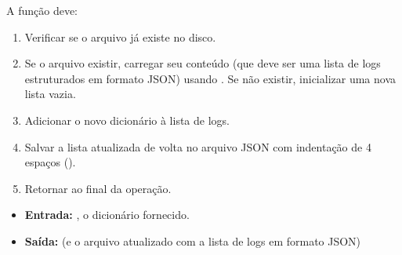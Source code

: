 \begin{enumerate}[label=\textbf{Q\arabic*.}]
A função deve:
\begin{enumerate}
    \item Verificar se o arquivo  já existe no disco.
    \item Se o arquivo existir, carregar seu conteúdo (que deve ser uma lista de logs estruturados em formato JSON) usando . Se não existir, inicializar uma nova lista vazia.
    \item Adicionar o novo dicionário  à lista de logs.
    \item Salvar a lista atualizada de volta no arquivo JSON com indentação de 4 espaços ().
    \item Retornar  ao final da operação.
\end{enumerate}

\begin{itemize}
    \item \textbf{Entrada:} , o dicionário  fornecido.
    \item \textbf{Saída:}  (e o arquivo  atualizado com a lista de logs em formato JSON)
\end{itemize}



\end{enumerate}